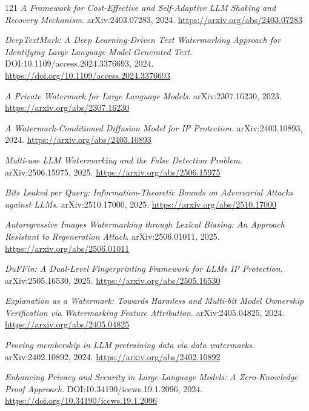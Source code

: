 \documentclass[11pt,a4paper]{article}
\begin{document}
\begin{thebibliography}{121}
\newblock \emph{A Framework for Cost-Effective and Self-Adaptive LLM Shaking and Recovery Mechanism}.
\newblock arXiv:2403.07283, 2024.
\newblock \url{https://arxiv.org/abs/2403.07283}

\newblock \emph{DeepTextMark: A Deep Learning-Driven Text Watermarking Approach for Identifying Large Language Model Generated Text}.
\newblock DOI:10.1109/access.2024.3376693, 2024.
\newblock \url{https://doi.org/10.1109/access.2024.3376693}

\newblock \emph{A Private Watermark for Large Language Models}.
\newblock arXiv:2307.16230, 2023.
\newblock \url{https://arxiv.org/abs/2307.16230}

\newblock \emph{A Watermark-Conditioned Diffusion Model for IP Protection}.
\newblock arXiv:2403.10893, 2024.
\newblock \url{https://arxiv.org/abs/2403.10893}

\newblock \emph{Multi-use LLM Watermarking and the False Detection Problem}.
\newblock arXiv:2506.15975, 2025.
\newblock \url{https://arxiv.org/abs/2506.15975}

\newblock \emph{Bits Leaked per Query: Information-Theoretic Bounds on Adversarial Attacks against LLMs}.
\newblock arXiv:2510.17000, 2025.
\newblock \url{https://arxiv.org/abs/2510.17000}

\newblock \emph{Autoregressive Images Watermarking through Lexical Biasing: An Approach Resistant to Regeneration Attack}.
\newblock arXiv:2506.01011, 2025.
\newblock \url{https://arxiv.org/abs/2506.01011}

\newblock \emph{DuFFin: A Dual-Level Fingerprinting Framework for LLMs IP Protection}.
\newblock arXiv:2505.16530, 2025.
\newblock \url{https://arxiv.org/abs/2505.16530}

\newblock \emph{Explanation as a Watermark: Towards Harmless and Multi-bit Model Ownership Verification via Watermarking Feature Attribution}.
\newblock arXiv:2405.04825, 2024.
\newblock \url{https://arxiv.org/abs/2405.04825}

\newblock \emph{Proving membership in LLM pretraining data via data watermarks}.
\newblock arXiv:2402.10892, 2024.
\newblock \url{https://arxiv.org/abs/2402.10892}

\newblock \emph{Enhancing Privacy and Security in Large-Language Models: A Zero-Knowledge Proof Approach}.
\newblock DOI:10.34190/iccws.19.1.2096, 2024.
\newblock \url{https://doi.org/10.34190/iccws.19.1.2096}


\end{thebibliography}
\end{document}
